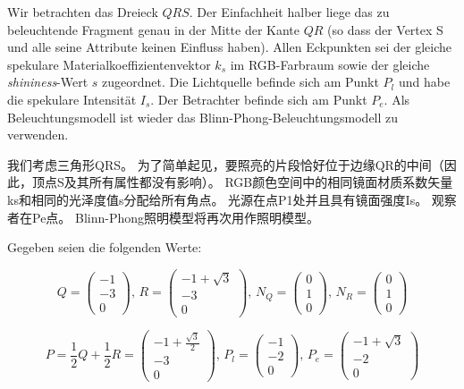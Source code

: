 \documentclass[fleqn]{article}
\begin{document}
Wir betrachten das Dreieck $QRS$. Der Einfachheit halber liege das zu beleuchtende Fragment
 genau in der Mitte der Kante $QR$ (so dass der Vertex S und alle seine Attribute keinen 
 Einfluss haben). Allen Eckpunkten sei der gleiche spekulare Materialkoeffizientenvektor $k_s$ 
 im RGB-Farbraum sowie der gleiche \textit{shininess}-Wert $s$ zugeordnet. Die Lichtquelle 
 befinde sich am Punkt $P_l$ und habe die spekulare Intensität $I_s$. Der Betrachter 
 befinde sich am Punkt $P_e$. Als Beleuchtungsmodell ist wieder das Blinn-Phong-Beleuchtungsmodell zu verwenden. 
 
 我们考虑三角形QRS。 为了简单起见，要照亮的片段恰好位于边缘QR的中间（因此，顶点S及其所有属性都没有影响）。 RGB颜色空间中的相同镜面材质系数矢量ks和相同的光泽度值s分配给所有角点。 光源在点P1处并且具有镜面强度Is。 观察者在Pe点。 Blinn-Phong照明模型将再次用作照明模型。

Gegeben seien die folgenden Werte:

$$Q=\begin{pmatrix}
    -1\\-3\\0
\end{pmatrix},\,R=\begin{pmatrix}
    -1+\sqrt{3}\\-3\\0
\end{pmatrix},\,N_Q=\begin{pmatrix}
    0\\1\\0
\end{pmatrix},\,N_R=\begin{pmatrix}
    0\\1\\0
\end{pmatrix}$$

$$P=\frac{1}{2}Q+\frac{1}{2}R=\begin{pmatrix}
    -1+\frac{\sqrt{3}}{2}\\-3\\0
\end{pmatrix},\,P_l=\begin{pmatrix}
    -1\\-2\\0
\end{pmatrix},\,P_e=\begin{pmatrix}
    -1+\sqrt{3}\\-2\\0
\end{pmatrix}$$
\end{document}
